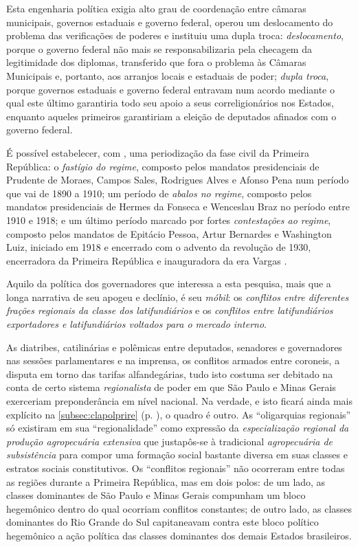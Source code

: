 Esta engenharia política exigia alto grau de coordenação entre câmaras municipais, governos estaduais e governo federal, operou um deslocamento do problema das verificações de poderes e instituiu uma dupla troca: \textit{deslocamento}, porque o governo federal não mais se responsabilizaria pela checagem da legitimidade dos diplomas, transferido que fora o problema às Câmaras Municipais e, portanto, aos arranjos locais e estaduais de poder; \textit{dupla troca}, porque governos estaduais e governo federal entravam num acordo mediante o qual este último garantiria todo seu apoio a seus correligionários nos Estados, enquanto aqueles primeiros garantiriam a eleição de deputados afinados com o governo federal.

É possível estabelecer, com , uma periodização da fase civil da Primeira República: o \textit{fastígio do regime}, composto pelos mandatos presidenciais de Prudente de Moraes, Campos Sales, Rodrigues Alves e Afonso Pena num período que vai de 1890 a 1910; um período de \textit{abalos no regime}, composto pelos mandatos presidenciais de Hermes da Fonseca e Wenceslau Braz no período entre 1910 e 1918; e um último período marcado por fortes \textit{contestações ao regime}, composto pelos mandatos de Epitácio Pessoa, Artur Bernardes e Washington Luiz, iniciado em 1918 e encerrado com o advento da revolução de 1930, encerradora da Primeira República e inauguradora da era Vargas \cite{carone_evolucao_1977}. 

Aquilo da política dos governadores que interessa a esta pesquisa, mais que a longa narrativa de seu apogeu e declínio, é seu \textit{móbil}: os \textit{conflitos entre diferentes frações regionais da classe dos latifundiários} e os \textit{conflitos entre latifundiários exportadores e latifundiários voltados para o mercado interno}. 

As diatribes, catilinárias e polêmicas entre deputados, senadores e governadores nas sessões parlamentares e na imprensa, os conflitos armados entre coroneis, a disputa em torno das tarifas alfandegárias, tudo isto costuma ser debitado na conta de certo sistema \textit{regionalista} de poder em que São Paulo e Minas Gerais exerceriam preponderância em nível nacional. Na verdade, e isto ficará ainda mais explícito na \autoref{subsec:clapolprire} (p. \pageref{subsec:clapolprire}), o quadro é outro. As ``oligarquias regionais'' só existiram em sua ``regionalidade'' como expressão da \textit{especialização regional da produção agropecuária extensiva} que justapôs-se à tradicional \textit{agropecuária de subsistência} para compor uma formação social bastante diversa em suas classes e estratos sociais constitutivos. Os ``conflitos regionais'' não ocorreram entre todas as regiões durante a Primeira República, mas em dois polos: de um lado, as classes dominantes de São Paulo e Minas Gerais compunham um bloco hegemônico dentro do qual ocorriam conflitos constantes; de outro lado, as classes dominantes do Rio Grande do Sul capitaneavam contra este bloco político hegemônico a ação política das classes dominantes dos demais Estados brasileiros.

